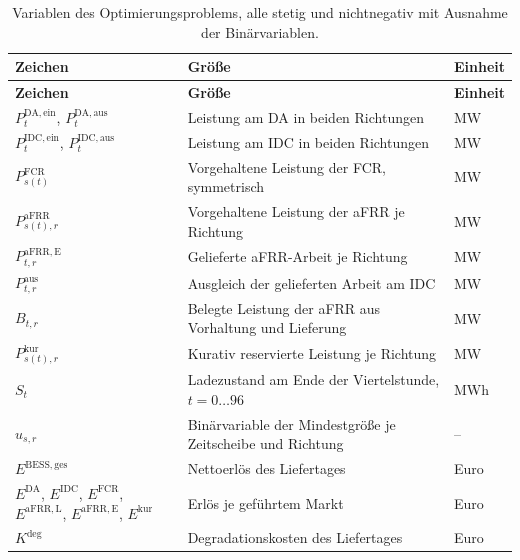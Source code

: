 {\footnotesize\renewcommand{\arraystretch}{1.15}
\begin{longtable}{@{}>{\raggedright\arraybackslash}p{}>{\raggedright\arraybackslash}p{}>{\raggedright\arraybackslash}p{}@{}}
    \caption{Variablen des Optimierungsproblems, alle stetig und nichtnegativ mit Ausnahme der Binärvariablen.}\label{tab:anh:modell:variablen}\\
    \hline
    \textbf{Zeichen} & \textbf{Größe} & \textbf{Einheit} \\
    \hline
    \endfirsthead
    \hline
    \textbf{Zeichen} & \textbf{Größe} & \textbf{Einheit} \\
    \hline
    \endhead
        $P^{\mathrm{DA,ein}}_t$, $P^{\mathrm{DA,aus}}_t$ & Leistung am \acs{DA} in beiden Richtungen & \si{MW} \\
        \hline
        $P^{\mathrm{IDC,ein}}_t$, $P^{\mathrm{IDC,aus}}_t$ & Leistung am \acs{IDC} in beiden Richtungen & \si{MW} \\
        \hline
        $P^{\mathrm{FCR}}_{s(t)}$ & Vorgehaltene Leistung der \acs{FCR}, symmetrisch & \si{MW} \\
        \hline
        $P^{\mathrm{aFRR}}_{s(t),r}$ & Vorgehaltene Leistung der \acs{aFRR} je Richtung & \si{MW} \\
        \hline
        $P^{\mathrm{aFRR,E}}_{t,r}$ & Gelieferte \acs{aFRR}-Arbeit je Richtung & \si{MW} \\
        \hline
        $P^{\mathrm{aus}}_{t,r}$ & Ausgleich der gelieferten Arbeit am \acs{IDC} & \si{MW} \\
        \hline
        $B_{t,r}$ & Belegte Leistung der \acs{aFRR} aus Vorhaltung und Lieferung & \si{MW} \\
        \hline
        $P^{\mathrm{kur}}_{s(t),r}$ & Kurativ reservierte Leistung je Richtung & \si{MW} \\
        \hline
        $S_t$ & Ladezustand am Ende der Viertelstunde, $t = 0 \ldots 96$ & \si{MWh} \\
        \hline
        $u_{s,r}$ & Binärvariable der Mindestgröße je Zeitscheibe und Richtung & -- \\
        \hline
        $E^{\mathrm{BESS,ges}}$ & Nettoerlös des Liefertages & Euro \\
        \hline
        $E^{\mathrm{DA}}$, $E^{\mathrm{IDC}}$, $E^{\mathrm{FCR}}$, $E^{\mathrm{aFRR,L}}$, $E^{\mathrm{aFRR,E}}$, $E^{\mathrm{kur}}$ & Erlös je geführtem Markt & Euro \\
        \hline
        $K^{\mathrm{deg}}$ & Degradationskosten des Liefertages & Euro \\
        \hline
\end{longtable}}

